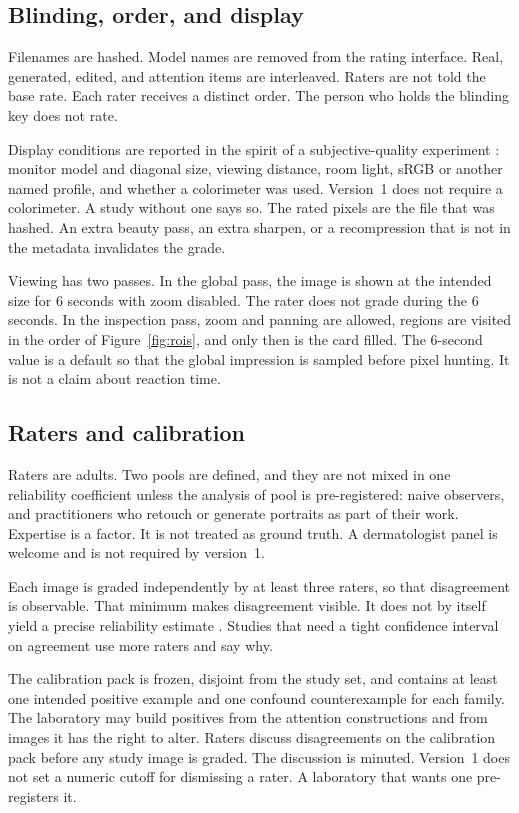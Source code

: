 \documentclass[10pt,twocolumn]{article}
\begin{document}
\subsection{Blinding, order, and display}

Filenames are hashed. Model names are removed from the rating interface. Real, generated, edited, and attention items are interleaved. Raters are not told the base rate. Each rater receives a distinct order. The person who holds the blinding key does not rate.

Display conditions are reported in the spirit of a subjective-quality experiment \cite{itu500}: monitor model and diagonal size, viewing distance, room light, sRGB or another named profile, and whether a colorimeter was used. Version~1 does not require a colorimeter. A study without one says so. The rated pixels are the file that was hashed. An extra beauty pass, an extra sharpen, or a recompression that is not in the metadata invalidates the grade.

Viewing has two passes. In the global pass, the image is shown at the intended size for 6 seconds with zoom disabled. The rater does not grade during the 6 seconds. In the inspection pass, zoom and panning are allowed, regions are visited in the order of Figure~\ref{fig:rois}, and only then is the card filled. The 6-second value is a default so that the global impression is sampled before pixel hunting. It is not a claim about reaction time.

\subsection{Raters and calibration}

Raters are adults. Two pools are defined, and they are not mixed in one reliability coefficient unless the analysis of pool is pre-registered: naive observers, and practitioners who retouch or generate portraits as part of their work. Expertise is a factor. It is not treated as ground truth. A dermatologist panel is welcome and is not required by version~1.

Each image is graded independently by at least three raters, so that disagreement is observable. That minimum makes disagreement visible. It does not by itself yield a precise reliability estimate \cite{hallgren2012}. Studies that need a tight confidence interval on agreement use more raters and say why.

The calibration pack is frozen, disjoint from the study set, and contains at least one intended positive example and one confound counterexample for each family. The laboratory may build positives from the attention constructions and from images it has the right to alter. Raters discuss disagreements on the calibration pack before any study image is graded. The discussion is minuted. Version~1 does not set a numeric cutoff for dismissing a rater. A laboratory that wants one pre-registers it.
\end{document}
